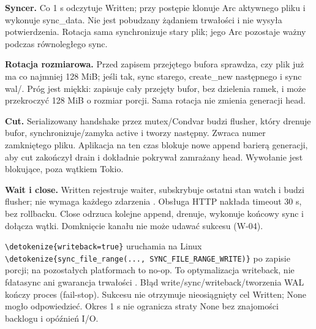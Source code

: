 \documentclass[11pt,a4paper]{article}
\newcommand{\code}[1]{\expandafter\nolinkurl\expandafter{\detokenize{#1}}}
\begin{document}
\textbf{Syncer.}  Co 1 s odczytuje Written; przy postępie klonuje
Arc aktywnego pliku i wykonuje sync\_data. Nie jest pobudzany żądaniem
trwałości i nie wysyła potwierdzenia. Rotacja sama synchronizuje stary
plik; jego Arc pozostaje ważny podczas równoległego sync.


\textbf{Rotacja rozmiarowa.}  Przed zapisem przejętego bufora sprawdza,
czy plik już ma co najmniej 128 MiB; jeśli tak, sync starego,
create\_new następnego i sync wal/. Próg jest miękki: zapisuje cały
przejęty bufor, bez dzielenia ramek, i może przekroczyć 128 MiB
o rozmiar porcji. Sama rotacja nie zmienia generacji head.


\textbf{Cut.}  Serializowany handshake przez mutex/Condvar budzi flusher,
który drenuje bufor, synchronizuje/zamyka active i tworzy następny.
Zwraca numer zamkniętego pliku. Aplikacja na ten czas blokuje nowe
append barierą generacji, aby cut zakończył drain i dokładnie pokrywał
zamrażany head. Wywołanie jest blokujące, poza wątkiem Tokio.


\textbf{Wait i close.}  Written rejestruje waiter, subskrybuje ostatni
stan watch i budzi flusher; nie wymaga każdego zdarzenia
\cite{tokio-watch}. Obsługa HTTP nakłada timeout 30 s, bez rollbacku.
Close odrzuca kolejne append, drenuje, wykonuje końcowy sync
i dołącza wątki. Domknięcie kanału nie może udawać sukcesu (W-04).


\code{writeback=true} uruchamia na Linux
\code{sync_file_range(..., SYNC_FILE_RANGE_WRITE)} po zapisie porcji;
na pozostałych platformach to no-op. To optymalizacja writeback,
nie fdatasync ani gwarancja trwałości \cite{linux-range}.
Błąd write/sync/writeback/tworzenia WAL kończy proces (fail-stop).
Sukcesu nie otrzymuje nieosiągnięty cel Written; None mogło odpowiedzieć.
Okres 1 s nie ogranicza straty None bez znajomości backlogu i opóźnień I/O.
\end{document}
